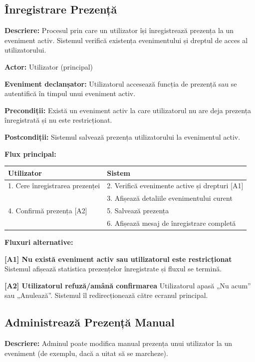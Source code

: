 \documentclass[a4paper,12pt,oneside]{report}
\begin{document}
\newpage
\subsection{Înregistrare Prezență}


\textbf{Descriere:} Procesul prin care un utilizator își înregistrează prezența la un eveniment activ. Sistemul verifică existența evenimentului și dreptul de acces al utilizatorului.

\textbf{Actor:} Utilizator (principal)

\textbf{Eveniment declanșator:} Utilizatorul accesează funcția de prezență sau se autentifică în timpul unui eveniment activ.

\textbf{Precondiții:} Există un eveniment activ la care utilizatorul nu are deja prezența înregistrată și nu este restricționat.

\textbf{Postcondiții:} Sistemul salvează prezența utilizatorului la evenimentul activ.

\textbf{Flux principal:}

\begin{tabular}{l l}
\hline
\textbf{Utilizator} & \textbf{Sistem} \\
\hline
1. Cere înregistrarea prezenței & 2. Verifică evenimente active și drepturi [A1] \\
 & 3. Afișează detaliile evenimentului curent \\
4. Confirmă prezența [A2] & 5. Salvează prezența \\
 & 6. Afișează mesaj de înregistrare completă \\
\hline
\end{tabular}

\textbf{Fluxuri alternative:}

\textbf{[A1] Nu există eveniment activ sau utilizatorul este restricționat}  
Sistemul afișează statistica prezențelor înregistrate și fluxul se termină.

\textbf{[A2] Utilizatorul refuză/amână confirmarea}  
Utilizatorul apasă „Nu acum” sau „Anulează”. Sistemul îl redirecționează către ecranul principal.


\subsection{Administrează Prezență Manual}


\textbf{Descriere:} Adminul poate modifica manual prezența unui utilizator la un eveniment (de exemplu, dacă a uitat să se marcheze).
\end{document}
